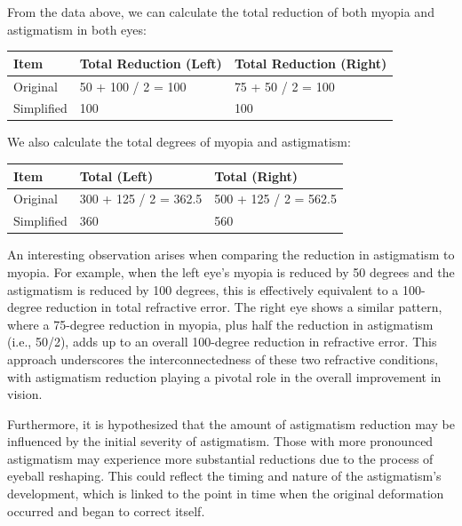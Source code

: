 \documentclass[12pt]{article}
\begin{document}
From the data above, we can calculate the total reduction of both myopia and astigmatism in both eyes:

\begin{table}[h!]
\centering
\begin{tabularx}{\textwidth}{|X|X|X|}
\hline
\textbf{Item} & \textbf{Total Reduction (Left)} & \textbf{Total Reduction (Right)} \\
\hline
Original & 50 + 100 / 2 = 100 & 75 + 50 / 2 = 100 \\
Simplified & 100 & 100 \\
\hline
\end{tabularx}
\end{table}

We also calculate the total degrees of myopia and astigmatism:

\begin{table}[h!]
\centering
\begin{tabularx}{\textwidth}{|X|X|X|}
\hline
\textbf{Item} & \textbf{Total (Left)} & \textbf{Total (Right)} \\
\hline
Original & 300 + 125 / 2 = 362.5 & 500 + 125 / 2 = 562.5 \\
Simplified & 360 & 560 \\
\hline
\end{tabularx}
\end{table}

An interesting observation arises when comparing the reduction in astigmatism to myopia. For example, when the left eye's myopia is reduced by 50 degrees and the astigmatism is reduced by 100 degrees, this is effectively equivalent to a 100-degree reduction in total refractive error. The right eye shows a similar pattern, where a 75-degree reduction in myopia, plus half the reduction in astigmatism (i.e., 50/2), adds up to an overall 100-degree reduction in refractive error. This approach underscores the interconnectedness of these two refractive conditions, with astigmatism reduction playing a pivotal role in the overall improvement in vision.

Furthermore, it is hypothesized that the amount of astigmatism reduction may be influenced by the initial severity of astigmatism. Those with more pronounced astigmatism may experience more substantial reductions due to the process of eyeball reshaping. This could reflect the timing and nature of the astigmatism's development, which is linked to the point in time when the original deformation occurred and began to correct itself.
\end{document}
